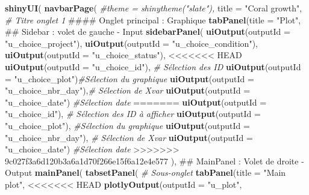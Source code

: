 \documentclass[]{report}
\newenvironment{Shaded}{\begin{snugshade}}{\end{snugshade}}
\newcommand{\KeywordTok}[1]{\textcolor[rgb]{0.13,0.29,0.53}{\textbf{#1}}}
\newcommand{\DataTypeTok}[1]{\textcolor[rgb]{0.13,0.29,0.53}{#1}}
\newcommand{\StringTok}[1]{\textcolor[rgb]{0.31,0.60,0.02}{#1}}
\newcommand{\CommentTok}[1]{\textcolor[rgb]{0.56,0.35,0.01}{\textit{#1}}}
\newcommand{\NormalTok}[1]{#1}
\begin{document}
\begin{Shaded}
\begin{Highlighting}[]
\KeywordTok{shinyUI}\NormalTok{(}
  \KeywordTok{navbarPage}\NormalTok{(}
    \CommentTok{#theme = shinytheme("slate"),}
    \DataTypeTok{title =} \StringTok{"Coral growth"}\NormalTok{, }\CommentTok{# Titre onglet 1}
\NormalTok{    #### Onglet principal : Graphique}
    \KeywordTok{tabPanel}\NormalTok{(}\DataTypeTok{title =} \StringTok{"Plot"}\NormalTok{,}
\NormalTok{             ## Sidebar : volet de gauche - Input}
             \KeywordTok{sidebarPanel}\NormalTok{(}
               \KeywordTok{uiOutput}\NormalTok{(}\DataTypeTok{outputId =} \StringTok{"u_choice_project"}\NormalTok{),}
               \KeywordTok{uiOutput}\NormalTok{(}\DataTypeTok{outputId =} \StringTok{"u_choice_condition"}\NormalTok{),}
               \KeywordTok{uiOutput}\NormalTok{(}\DataTypeTok{outputId =} \StringTok{"u_choice_status"}\NormalTok{),}
<<<<<<< HEAD
               \KeywordTok{uiOutput}\NormalTok{(}\DataTypeTok{outputId =} \StringTok{"u_choice_id"}\NormalTok{), }\CommentTok{# Sélection des ID}
               \KeywordTok{uiOutput}\NormalTok{(}\DataTypeTok{outputId =} \StringTok{"u_choice_plot"}\NormalTok{)}\CommentTok{#Sélection du graphique}
               \KeywordTok{uiOutput}\NormalTok{(}\DataTypeTok{outputId =} \StringTok{"u_choice_nbr_day"}\NormalTok{),}\CommentTok{# Sélection de Xvar}
               \KeywordTok{uiOutput}\NormalTok{(}\DataTypeTok{outputId =} \StringTok{"u_choice_date"}\NormalTok{)       }\CommentTok{#Sélection date}
=======
               \KeywordTok{uiOutput}\NormalTok{(}\DataTypeTok{outputId =} \StringTok{"u_choice_id"}\NormalTok{), }\CommentTok{# Sélection des ID à afficher}
               \KeywordTok{uiOutput}\NormalTok{(}\DataTypeTok{outputId =} \StringTok{"u_choice_plot"}\NormalTok{),     }\CommentTok{#Sélection du graphique}
               \KeywordTok{uiOutput}\NormalTok{(}\DataTypeTok{outputId =} \StringTok{"u_choice_nbr_day"}\NormalTok{),      }\CommentTok{# Sélection de Xvar}
               \KeywordTok{uiOutput}\NormalTok{(}\DataTypeTok{outputId =} \StringTok{"u_choice_date"}\NormalTok{)              }\CommentTok{#Sélection date}
>>>>>>> 9c027f3a6d120b3a6a1d70f266e15f6a12e4e577
\NormalTok{             ),}
\NormalTok{             ## MainPanel : Volet de droite - Output}
             \KeywordTok{mainPanel}\NormalTok{(}
               \KeywordTok{tabsetPanel}\NormalTok{(}
                 \CommentTok{# Sous-onglet}
                 \KeywordTok{tabPanel}\NormalTok{(}\DataTypeTok{title =} \StringTok{"Main plot"}\NormalTok{,}
<<<<<<< HEAD
                          \KeywordTok{plotlyOutput}\NormalTok{(}\DataTypeTok{outputId =} \StringTok{"u_plot"}\NormalTok{, }

\end{Highlighting}
\end{Shaded}
\end{document}

